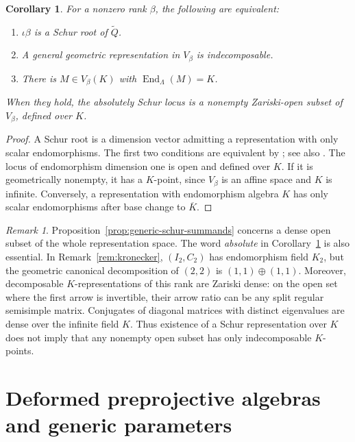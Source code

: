 \documentclass[11pt, reqno]{amsart}
\numberwithin{equation}{section}
\newtheorem{corollary}[theorem]{Corollary}
\theoremstyle{definition}
\theoremstyle{remark}
\newtheorem{remark}[theorem]{Remark}
\newcommand{\op}[1]{\operatorname{#1}}
\newcommand{\End}{\op{End}}
\newcommand{\Qbar}{\widetilde Q}
\newcommand{\Kbar}{\overline K}
\begin{document}
\begin{corollary}\label{cor:absolute-schur-ranks}
For a nonzero rank $\beta$, the following are equivalent:
\begin{enumerate}
\item $\iota\beta$ is a Schur root of $\Qbar$.
\item A general geometric representation in $V_\beta$ is indecomposable.
\item There is $M\in V_\beta(K)$ with $\End_\Lambda(M)=K$.
\end{enumerate}
When they hold, the absolutely Schur locus is a nonempty
Zariski-open subset of $V_\beta$, defined over $K$.
\end{corollary}
\begin{proof}
A Schur root is a dimension vector admitting a representation with
only scalar endomorphisms. The first two conditions are equivalent
by \cite[Proposition~1(a)]{Kac82}; see also
\cite[Section~2.3]{DWcomb}. The locus of endomorphism dimension
one is open and defined over $K$. If it is geometrically nonempty,
it has a $K$-point, since $V_\beta$ is an affine space and $K$ is
infinite. Conversely, a representation with endomorphism algebra $K$
has only scalar endomorphisms after base change to $\Kbar$.
\end{proof}

\begin{remark}\label{rem:arithmetic-schur-genericity}
Proposition~\ref{prop:generic-schur-summands} concerns a dense open
subset of the whole representation space. The word \emph{absolute} in
Corollary~\ref{cor:absolute-schur-ranks} is also essential. In
Remark~\ref{rem:kronecker}, $(I_2,C_2)$ has endomorphism field $K_2$,
but the geometric canonical decomposition of $(2,2)$ is
$(1,1)\oplus(1,1)$. Moreover, decomposable $K$-representations of this
rank are Zariski dense: on the open set where the first arrow is
invertible, their arrow ratio can be any split regular semisimple
matrix. Conjugates of diagonal matrices with distinct eigenvalues
are dense over the infinite field $K$. Thus existence of a Schur
representation over $K$ does not imply that any nonempty open
subset has only indecomposable $K$-points.
\end{remark}


\section{Deformed preprojective algebras and generic parameters}
\label{sec:moment}
\end{document}
